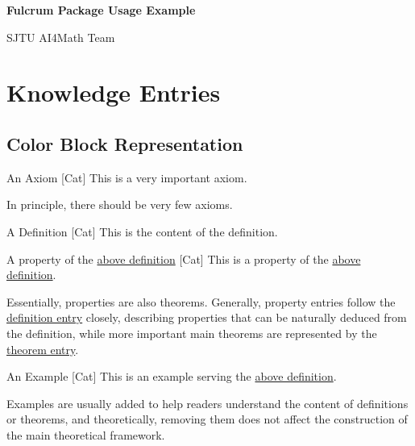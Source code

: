 \documentclass[UTF8]{ctexart}
\begin{document}
    \begin{center}
        {\LARGE\textbf{Fulcrum Package Usage Example}}

        SJTU AI4Math Team
    \end{center}
    \section{Knowledge Entries}

    \subsection{Color Block Representation}
        
        \begin{axm}
            [TheAxiom]
            {An Axiom}
            [Cat]
            This is a very important axiom.

            In principle, there should be very few axioms.
        \end{axm}
    
        \begin{dfn}
            [TheDefinition]
            {A Definition}
            [Cat]
            This is the content of the definition.
        \end{dfn}
        
        \begin{ppt}
            [TheProperty]
            {A property of the \hyperref[dfn:TheDefinition]{above definition}}
            [Cat]
            This is a property of the \hyperref[dfn:TheDefinition]{above definition}.

            Essentially, properties are also theorems. Generally, property entries follow the \hyperref[dfn:TheDefinition]{definition entry} closely, describing properties that can be naturally deduced from the definition, while more important main theorems are represented by the \hyperref[thm:TheTheorem]{theorem entry}.
        \end{ppt}
        
        \begin{xmp}
            [TheExample]
            {An Example}
            [Cat]
            This is an example serving the \hyperref[dfn:TheDefinition]{above definition}.
            
            Examples are usually added to help readers understand the content of definitions or theorems, and theoretically, removing them does not affect the construction of the main theoretical framework.
        \end{xmp}
        
\end{document}
